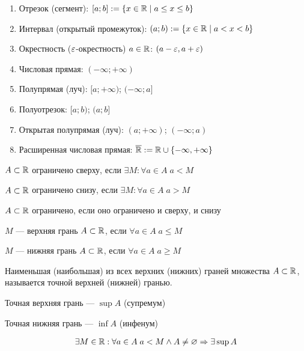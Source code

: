 \documentclass{article}
\begin{document}

\begin{enumerate}
	\item Отрезок (сегмент): $[a;b] := \{x\in\mathbb{R}\;|\;a\leq x\leq b\}$
	\item Интервал (открытый промежуток): $(a;b) := \{x\in\mathbb{R}\;|\;a<x<b\}$
	\item Окрестность ($\varepsilon$-окрестность) $a\in\mathbb{R}$:
	      $(a-\varepsilon,a+\varepsilon)$
	\item Числовая прямая: $(-\infty;+\infty)$
	\item Полупрямая (луч): $[a;+\infty)$; $(-\infty;a]$
	\item Полуотрезок: $[a;b)$; $(a;b]$
	\item Открытая полупрямая (луч): $(a;+\infty)$; $(-\infty;a)$
	\item Расширенная числовая прямая: $\overline{\mathbb{R}}:=\mathbb{R}\cup\{-\infty,+\infty\}$
\end{enumerate}


$A\subset\mathbb{R}$ ограничено сверху, если $\exists M:\forall a\in A\;a<M$

$A\subset\mathbb{R}$ ограничено снизу, если $\exists M:\forall a\in A\;a>M$

$A\subset\mathbb{R}$ ограничено, если оно ограничено и сверху, и снизу


$M$ --- верхняя грань $A\subset\mathbb{R}$, если $\forall a\in A\;a\leq M$

$M$ --- нижняя грань $A\subset\mathbb{R}$, если $\forall a\in A\;a\geq M$

Наименьшая (наибольшая) из всех верхних (нижних) граней множества $A\subset\mathbb{R}$,
называется точной верхней (нижней) гранью.

Точная верхняя грань --- $\sup A$ (супремум)

Точная нижняя грань --- $\inf A$ (инфенум)

\pagebreak

\theorem
\begin{align*}
	 & \exists M\in\mathbb{R}:\forall a\in A\;a<M \land A\neq\varnothing \Rightarrow \exists \sup A \\
\end{align*}
\end{document}

